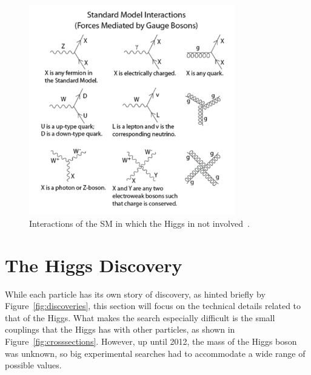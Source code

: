 \begin{figure}[ht]
 \begin{center}
    \includegraphics[width=0.80\textwidth]{figures/intro/Standard_Model_Feynman_Diagram_Vertices.pdf}
      \end{center}
\caption{Interactions of the SM in which the Higgs in not involved~\cite{SMinteractions_nonhiggs}.}
\label{fig:nonhiggsint}
\end{figure}

\section{The Higgs Discovery\label{sec:discovery}}

While each particle has its own story of discovery, as hinted briefly by Figure~\ref{fig:discoveries},
this section will focus on the technical details related to that of the Higgs.
What makes the search especially difficult is the
small couplings that the Higgs has with other particles, as shown in Figure~\ref{fig:crosssections}.
However, up until 2012, the mass of the Higgs boson was unknown, so big experimental searches
had to accommodate a wide range of possible values.

